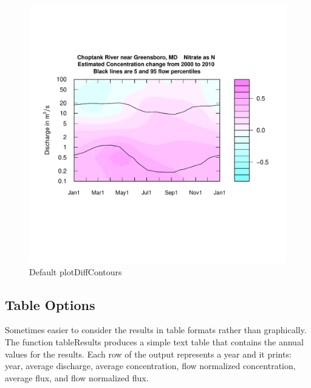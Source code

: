\documentclass[a4paper,11pt]{article}\usepackage{graphicx, color}
\newenvironment{knitrout}{}{} %
\begin{document}
\begin{knitrout}
\color{fgcolor}\begin{figure}[]

\includegraphics[width=1\linewidth,height=1\linewidth]{figure/plotDiffContours} \caption[Default plotDiffContours]{Default plotDiffContours\label{fig:plotDiffContours}}
\end{figure}


\end{knitrout}



\FloatBarrier
\subsection{Table Options}
\label{sec:wrtdsTable}
Sometimes easier to consider the results in table formats rather than graphically. The function tableResults produces a simple text table that contains the annual values for the results.  Each row of the output represents a year and it prints: year, average discharge, average concentration, flow normalized concentration, average flux, and flow normalized flux.  
\end{document}
